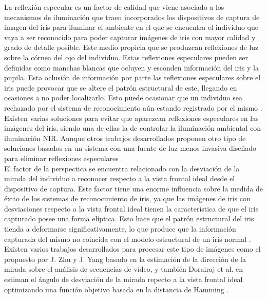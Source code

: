 La reflexión especular es un factor de calidad que viene asociado a los mecanismos de iluminación que traen incorporados los dispositivos de captura de imagen del iris para iluminar el ambiente en el que se encuentra el individuo que vaya a ser reconocido para poder capturar imágenes de iris con mayor calidad y grado de detalle posible. Este medio propicia que se produzcan reflexiones de luz sobre la córnea del ojo del individuo. Estas reflexiones especulares pueden ser definidas como manchas blancas que ocluyen y esconden información del iris y la pupila. Esta oclusión de información por parte las reflexiones especulares sobre el iris puede provocar que se altere el patrón estructural de este, llegando en ocasiones a no poder localizarlo. Esto puede ocasionar que un individuo sea rechazado por el sistema de reconocimiento aún estando registrado por el mismo \cite{Reference9}. \\

Existen varias soluciones para evitar que aparezcan reflexiones especulares en las imágenes del iris, siendo una de ellas la de controlar la iluminación ambiental con iluminación NIR. Aunque otros trabajos desarrollados proponen otro tipo de soluciones basados en un sistema con una fuente de luz menos invasiva diseñado para eliminar reflexiones especulares \cite{Reference12}. \\

El factor de la perspectica se encuentra relacionado con la desviación de la mirada del individuo a reconocer respecto a la vista frontal ideal desde el dispositivo de captura. Este factor tiene una enorme influencia sobre la medida de éxito de los sistemas de reconocimiento de iris, ya que las imágenes de iris con desviaciones respecto a la vista frontal ideal tienen la característica de que el iris capturado posee una forma elíptica. Esto hace que el patrón estructural del iris tienda a deformarse significativamente, lo que produce que la información capturada del mismo no coincida con el modelo estructural de un iris normal \cite{Reference9}. \\  

Existen varios trabajos desarrollados para procesar este tipo de imágenes como el propuesto por J. Zhu y J. Yang \cite{Reference13} basado en la estimación de la dirección de la mirada sobre el análisis de secuencias de vídeo, y también Dorairaj et al. en \cite{Reference14} estiman el ángulo de desviación de la mirada repecto a la vista frontal ideal optimizando una función objetivo basada en la distancia de Hamming \cite{Reference15}. \\

